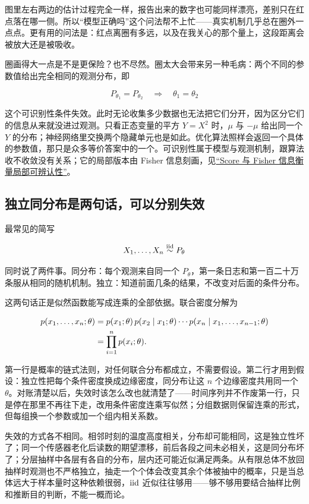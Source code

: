 图里左右两边的估计过程完全一样，报告出来的数字也可能同样漂亮，差别只在红点落在哪一侧。所以``模型正确吗''这个问法帮不上忙——真实机制几乎总在圈外一点点。更有用的问法是：红点离圈有多远，以及在我关心的那个量上，这段距离会被放大还是被吸收。

圈画得大一点是不是更保险？也不尽然。圈太大会带来另一种毛病：两个不同的参数值给出完全相同的观测分布，即

\[
P_{\theta_1}=P_{\theta_2}\quad\Longrightarrow\quad\theta_1=\theta_2
\]

这个可识别性条件失效。此时无论收集多少数据也无法把它们分开，因为区分它们的信息从来就没进过观测。只看正态变量的平方 \(Y=X^2\) 时，\(\mu\) 与 \(-\mu\) 给出同一个 \(Y\) 的分布；神经网络里交换两个隐藏单元也是如此。优化算法照样会返回一个具体的参数值，那只是众多等价答案中的一个。可识别性属于模型与观测机制，跟算法收不收敛没有关系；它的局部版本由 Fisher 信息刻画，见\hyperref[sec:11-Mathematical-Statistics/03-Sufficient-Statistics-and-Information/02]{``Score 与 Fisher 信息衡量局部可辨认性''}。

\subsection{独立同分布是两句话，可以分别失效}

最常见的简写

\[
X_1,\ldots,X_n\overset{\mathrm{iid}}{\sim}P_\theta
\]

同时说了两件事。同分布：每个观测来自同一个 \(P_\theta\)，第一条日志和第一百二十万条服从相同的随机机制。独立：知道前面几条的结果，不改变对后面的条件分布。

这两句话正是似然函数能写成连乘的全部依据。联合密度分解为

\[
\begin{aligned}
p(x_1,\ldots,x_n;\theta)
&=p(x_1;\theta)\,p(x_2\mid x_1;\theta)\cdots p(x_n\mid x_1,\ldots,x_{n-1};\theta)\\
&=\prod_{i=1}^{n}p(x_i;\theta).
\end{aligned}
\]

第一行是概率的链式法则，对任何联合分布都成立，不需要假设。第二行才用到假设：独立性把每个条件密度换成边缘密度，同分布让这 \(n\) 个边缘密度共用同一个 \(\theta\)。对账清楚以后，失效时该怎么改也就清楚了——时间序列并不作废第一行，只是停在那里不再往下走，改用条件密度连乘写似然；分组数据则保留连乘的形式，但每组换一个参数或加一个组内相关系数。

失效的方式各不相同。相邻时刻的温度高度相关，分布却可能相同，这是独立性坏了；同一个传感器老化后读数的期望漂移，前后各段之间未必相关，这是同分布坏了；分层抽样中各层有各自的分布，层内还可能近似满足两条。从有限总体不放回抽样时观测也不严格独立，抽走一个个体会改变其余个体被抽中的概率，只是当总体远大于样本量时这种依赖很弱，\(\mathrm{iid}\) 近似往往够用——够不够用要结合抽样比例和推断目的判断，不能一概而论。

